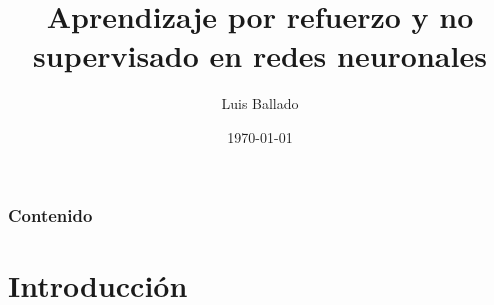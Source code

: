 \documentclass[
	11pt, %
]{beamer}
\title[REDES NEURONALES]{Aprendizaje por refuerzo y no supervisado en redes neuronales} %
\author[Luis Ballado]{Luis Ballado} %
\institute[CINVESTAV]{CINVESTAV - UNIDAD TAMAULIPAS \\ \smallskip \textit{luis.ballado@cinvestav.mx}} %
\date[\today]{\today} %
\begin{document}

\begin{frame}
	\titlepage %
\end{frame}



\begin{frame}
	\frametitle{Contenido} %
	
	\tableofcontents %
\end{frame}


\section{Introducción} %
\end{document}
